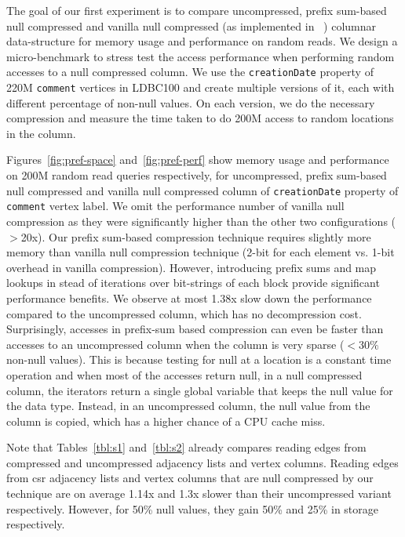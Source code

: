 The goal of our first experiment is to compare uncompressed, prefix sum-based null compressed and vanilla null compressed (as implemented in ~\cite{abadi-sparse-col}) columnar data-structure for memory usage and performance on random reads. We design a micro-benchmark to stress test the access performance when performing random accesses to a null compressed column. We use the \texttt{creationDate} property of 220M \texttt{comment} vertices in LDBC100 and create multiple versions of it, each with different percentage of non-null values. On each version, we do the necessary compression and measure the time taken to do 200M access to random locations in the column. 

Figures~\ref{fig:pref-space} and~\ref{fig:pref-perf} show memory usage and performance on 200M random read queries respectively, for uncompressed, prefix sum-based null compressed and vanilla null compressed column of \texttt{creationDate} property of \texttt{comment} vertex label. We omit the performance number of vanilla null compression as they were significantly higher than the other two configurations ($>$20x). Our prefix sum-based  compression technique requires slightly more memory than vanilla null compression technique (2-bit for each element vs. 1-bit overhead in vanilla compression). However, introducing prefix sums and map lookups in stead of iterations over bit-strings of each block provide significant performance benefits. We observe at most 1.38x slow down the performance compared to the uncompressed column, which has no decompression cost. Surprisingly, accesses in prefix-sum based compression can even be faster than accesses to an uncompressed column when the column is very sparse ($<30\%$ non-null values). This is because testing for null at a location is a constant time operation and when most of the accesses return null, in a null compressed column, the iterators return a single global variable that keeps  the null value for the data type. Instead, in an uncompressed column, the null value from the column is copied, which has a higher chance of a CPU cache miss. 


Note that Tables~\ref{tbl:s1} and~\ref{tbl:s2} already compares reading edges from compressed and uncompressed adjacency lists and vertex columns. Reading edges from \gls{csr} adjacency lists and vertex columns that are null compressed by our technique are on average 1.14x and 1.3x slower than their uncompressed variant respectively. However, for 50\% null values, they gain 50\% and 25\% in storage respectively. 


